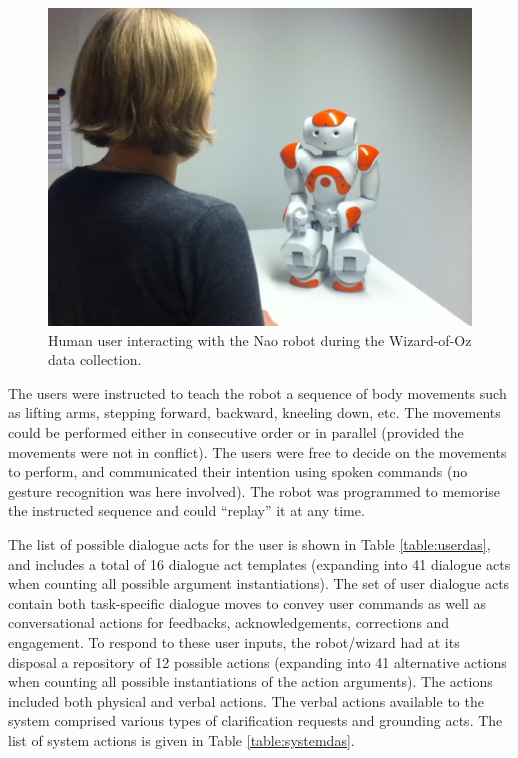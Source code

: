 \begin{figure}[h]
\begin{center}
\includegraphics[scale=0.25]{imgs/bilde.jpg}
\end{center}
\caption{Human user interacting with the Nao robot during the Wizard-of-Oz data collection.}
\label{fig:nao}
\end{figure}

The users were instructed to teach the robot a sequence of body movements such as lifting arms, stepping forward, backward, kneeling down, etc.  The movements could be performed either in consecutive order or in parallel (provided the movements were not in conflict).  The users were free to decide on the movements to perform, and communicated their intention using spoken commands (no gesture recognition was here involved).  The robot was programmed to memorise the instructed sequence and could ``replay'' it at any time.

The list of possible dialogue acts for the user is shown in Table \ref{table:userdas}, and includes a total of 16 dialogue act templates (expanding into 41 dialogue acts when counting all possible argument instantiations). The set of user dialogue acts contain both task-specific dialogue moves to convey user commands as well as conversational actions for feedbacks, acknowledgements, corrections and engagement.  To respond to these user inputs, the robot/wizard had at its disposal a repository of 12 possible actions (expanding into 41 alternative actions when counting all possible instantiations of the action arguments).  The actions included both physical and verbal actions. The verbal actions available to the system comprised various types of clarification requests and grounding acts. The list of system actions is given in Table \ref{table:systemdas}. 

